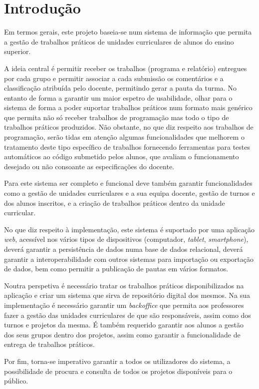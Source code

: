 \section{Introdução}
Em termos gerais, este projeto baseia-se num sistema de informação que permita a gestão de trabalhos 
práticos de unidades curriculares de alunos do ensino superior.

A ideia central é permitir receber os trabalhos (programa e relatório) entregues por cada grupo e 
permitir associar a cada submissão os comentários e a classificação atribuída pelo docente, 
permitindo gerar a pauta da turma. No entanto de forma a garantir um maior 
espetro de usabilidade, olhar para o sistema de forma a poder suportar 
trabalhos práticos num formato mais genérico que permita não só receber 
trabalhos de programação mas todo o tipo de trabalhos práticos produzidos.
Não obstante, no que diz respeito aos trabalhos de programação, serão tidas em 
atenção algumas funcionalidades que melhorem o tratamento deste tipo específico 
de trabalhos fornecendo ferramentas para testes automáticos ao código submetido 
pelos alunos, que avaliam o funcionamento desejado ou não consoante as 
especificações do docente.

Para este sistema ser completo e funcional deve também garantir funcionalidades como
a gestão de unidades curriculares e a sua equipa docente,  gestão de turnos e dos alunos inscritos, e a
criação de trabalhos práticos dentro da unidade curricular.

No que diz respeito à implementação, este sistema é suportado por uma aplicação \textit{web}, acessível
nos vários tipos de dispositivos (computador, \textit{tablet}, \textit{smartphone}), deverá garantir a persistência de 
dados numa base de dados relacional, deverá garantir a interoperabilidade com outros sistemas para
importação ou exportação de dados, bem como permitir a publicação de pautas em vários formatos.

Noutra perspetiva é necessário tratar os trabalhos práticos disponibilizados na aplicação
e criar um sistema que sirva de repositório digital dos mesmos. Na sua implementação é necessário
garantir um \textit{backoffice} que permita aos professores fazer a gestão das unidades curriculares
de que são responsáveis, assim como dos turnos e projetos da mesma. É também requerido garantir
aos alunos a gestão dos seus grupos dentro dos projetos, assim como garantir a funcionalidade
de entrega de trabalhos práticos.
 
 Por fim, torna-se imperativo garantir a todos os utilizadores do sistema, a possibilidade de procura
 e consulta de todos os projetos disponíveis para o público.
 
